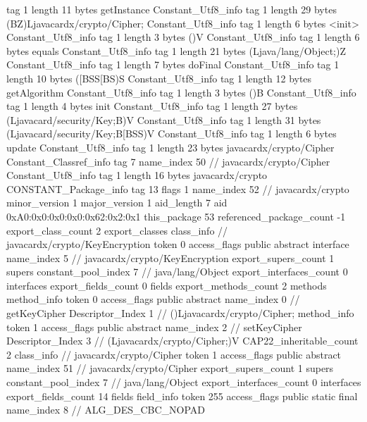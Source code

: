 {{{			tag	1
			length	11
			bytes	getInstance
		}
		Constant_Utf8_info {
			tag	1
			length	29
			bytes	(BZ)Ljavacardx/crypto/Cipher;
		}
		Constant_Utf8_info {
			tag	1
			length	6
			bytes	<init>
		}
		Constant_Utf8_info {
			tag	1
			length	3
			bytes	()V
		}
		Constant_Utf8_info {
			tag	1
			length	6
			bytes	equals
		}
		Constant_Utf8_info {
			tag	1
			length	21
			bytes	(Ljava/lang/Object;)Z
		}
		Constant_Utf8_info {
			tag	1
			length	7
			bytes	doFinal
		}
		Constant_Utf8_info {
			tag	1
			length	10
			bytes	([BSS[BS)S
		}
		Constant_Utf8_info {
			tag	1
			length	12
			bytes	getAlgorithm
		}
		Constant_Utf8_info {
			tag	1
			length	3
			bytes	()B
		}
		Constant_Utf8_info {
			tag	1
			length	4
			bytes	init
		}
		Constant_Utf8_info {
			tag	1
			length	27
			bytes	(Ljavacard/security/Key;B)V
		}
		Constant_Utf8_info {
			tag	1
			length	31
			bytes	(Ljavacard/security/Key;B[BSS)V
		}
		Constant_Utf8_info {
			tag	1
			length	6
			bytes	update
		}
		Constant_Utf8_info {
			tag	1
			length	23
			bytes	javacardx/crypto/Cipher
		}
		Constant_Classref_info {
			tag	7
			name_index	50		// javacardx/crypto/Cipher
		}
		Constant_Utf8_info {
			tag	1
			length	16
			bytes	javacardx/crypto
		}
		CONSTANT_Package_info {
			tag	13
			flags	1
			name_index	52		// javacardx/crypto
			minor_version	1
			major_version	1
			aid_length	7
			aid	0xA0:0x0:0x0:0x0:0x62:0x2:0x1
		}
	}
	this_package	53
	referenced_package_count	-1
	export_class_count	2
	export_classes {
		class_info {		// javacardx/crypto/KeyEncryption
			token	0
			access_flags	public abstract interface
			name_index	5		// javacardx/crypto/KeyEncryption
			export_supers_count	1
			supers {
				constant_pool_index	7		// java/lang/Object
			}
			export_interfaces_count	0
			interfaces {
			}
			export_fields_count	0
			fields {
			}
			export_methods_count	2
			methods {
				method_info {
					token	0
					access_flags	public abstract
					name_index	0		// getKeyCipher
					Descriptor_Index	1		// ()Ljavacardx/crypto/Cipher;
				}
				method_info {
					token	1
					access_flags	public abstract
					name_index	2		// setKeyCipher
					Descriptor_Index	3		// (Ljavacardx/crypto/Cipher;)V
				}
			}
			CAP22_inheritable_count	2
		}
		class_info {		// javacardx/crypto/Cipher
			token	1
			access_flags	public abstract
			name_index	51		// javacardx/crypto/Cipher
			export_supers_count	1
			supers {
				constant_pool_index	7		// java/lang/Object
			}
			export_interfaces_count	0
			interfaces {
			}
			export_fields_count	14
			fields {
			field_info {
				token	255
				access_flags	public static final
				name_index	8		// ALG_DES_CBC_NOPAD
}}}}}
